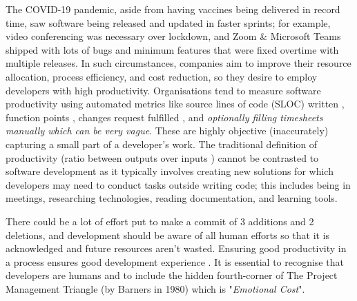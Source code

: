 The COVID-19 pandemic, aside from having vaccines being delivered in record time, saw software being released and updated in faster sprints; for example, video conferencing was necessary over lockdown, and Zoom \& Microsoft Teams shipped with lots of bugs and minimum features that were fixed overtime with multiple releases. In such circumstances, companies aim to improve their resource allocation, process efficiency, and cost reduction, so they desire to employ developers with high productivity. Organisations tend to measure software productivity \cite{devanbuAnalyticalEmpiricalEvaluation1996} using automated metrics like source lines of code (SLOC) written \cite{barry1981software,conteSoftwareEngineeringMetrics1986,jonesProgrammingProductivity1985,walstonMethodProgrammingMeasurement1977,devanbuAnalyticalEmpiricalEvaluation1996}, function points \cite{albrecht1979measuring,computerstaffSoftwareMetricsGood1994}, changes request fulfilled \cite{cataldoSociotechnicalCongruenceFramework2008,millerHowWasYour2021}, and \textit{optionally filling timesheets manually which can be very vague}. These are highly objective (inaccurately) capturing a small part of a developer's work. The traditional definition of productivity (ratio between outputs over inputs \cite{morisioFrameworkBasedSoftware1999,pritchard1995productivity}) cannot be contrasted to software development as it typically involves creating new solutions \cite{trendowiczChapterFactorsInfluencing2009} for which developers may need to conduct tasks outside writing code; this includes being in meetings, researching technologies, reading documentation, and learning tools.

There could be a lot of effort put to make a commit of 3 additions and 2 deletions, and development should be aware of all human efforts so that it is acknowledged and future resources aren't wasted. Ensuring good productivity in a process ensures good development experience \cite{amabileProgressPrincipleUsing2011,graziotinFeelingsMatterCorrelation2015,meyerSoftwareDevelopersPerceptions2014,mullerStuckFrustratedFlow2015}. It is essential to recognise that developers are humans and to include the hidden fourth-corner of The Project Management Triangle (by Barners in 1980) which is "\textit{Emotional Cost}".

